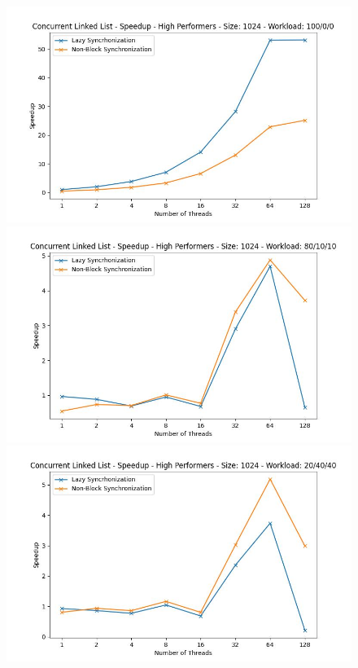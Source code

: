 \documentclass[../final_report.tex]{subfiles}
\begin{document}
\begin{figure}[H]
    \centering
        \includegraphics[scale=0.4]{outFiles/plots/concurrent_data_structs_high_speedup_1024_100_0_0.jpg}
        \includegraphics[scale=0.4]{outFiles/plots/concurrent_data_structs_high_speedup_1024_80_10_10.jpg}
        \includegraphics[scale=0.4]{outFiles/plots/concurrent_data_structs_high_speedup_1024_20_40_40.jpg}

\end{figure}
\end{document}
